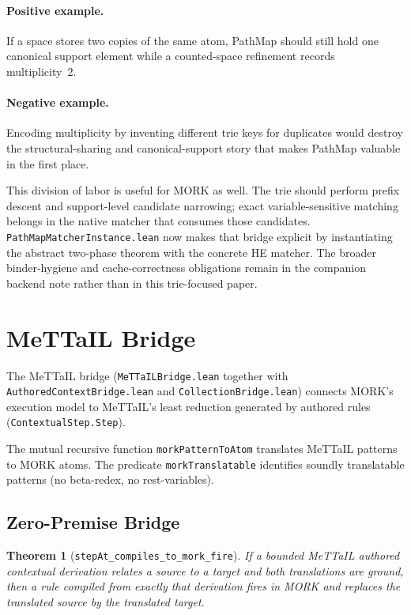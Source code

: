 \documentclass[11pt]{article}
\newtheorem{theorem}{Theorem}[section]
\theoremstyle{definition}
\theoremstyle{remark}
\newcommand{\MORK}{\textup{MORK}}
\newcommand{\MeTTaIL}{\textup{MeTTaIL}}
\newcommand{\HE}{\textup{HE}}
\newcommand{\PathMap}{\textup{PathMap}}
\begin{document}
\paragraph{Positive example.}
If a space stores two copies of the same atom, \PathMap{} should still hold
one canonical support element while a counted-space refinement records
multiplicity~2.

\paragraph{Negative example.}
Encoding multiplicity by inventing different trie keys for duplicates would
destroy the structural-sharing and canonical-support story that makes
\PathMap{} valuable in the first place.

This division of labor is useful for \MORK{} as well.  The trie should
perform prefix descent and support-level candidate narrowing; exact
variable-sensitive matching belongs in the native matcher that consumes those
candidates.  \texttt{PathMapMatcherInstance.lean} now makes that bridge
explicit by instantiating the abstract two-phase theorem with the concrete
\HE{} matcher.  The broader binder-hygiene and cache-correctness obligations
remain in the companion backend note rather than in this trie-focused paper.

\section{MeTTaIL Bridge}
\label{sec:mettail}

The \MeTTaIL{} bridge (\texttt{MeTTaILBridge.lean} together with
\texttt{AuthoredContextBridge.lean} and \texttt{CollectionBridge.lean})
connects \MORK{}'s execution model to \MeTTaIL{}'s least reduction generated by
authored rules (\texttt{ContextualStep.Step}).

The mutual recursive function \texttt{morkPatternToAtom} translates
\MeTTaIL{} patterns to \MORK{} atoms.
The predicate \texttt{morkTranslatable} identifies soundly translatable
patterns (no beta-redex, no rest-variables).

\subsection{Zero-Premise Bridge}

\begin{theorem}[\texttt{stepAt\_compiles\_to\_mork\_fire}]
\label{thm:bridge}
If a bounded \MeTTaIL{} authored contextual derivation relates a source to a
target and both translations are ground, then a rule compiled from exactly
that derivation fires in \MORK{} and replaces the translated source by the
translated target.
\end{theorem}
\end{document}

